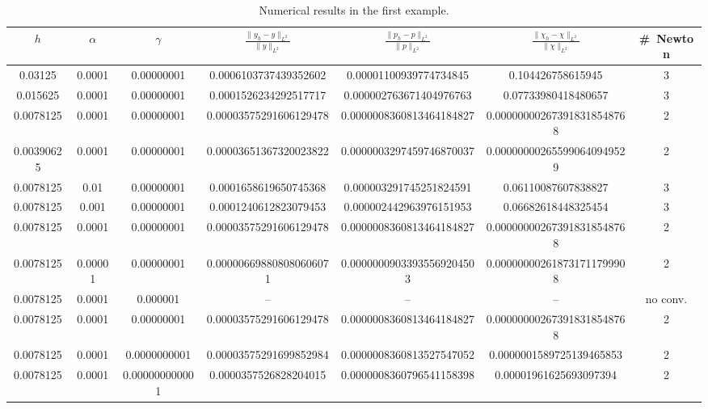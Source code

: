 \documentclass[reqno]{shinyart}
\begin{document}
\begin{table}
    \caption{Numerical results in the first example.}\label{tab:ex1}
    \centering
    \begin{tabular}{ccccccc}
        \toprule
        $h$ & $\alpha$ & $\gamma$ & $\frac{\|y_h - y\|_{L^2}}{\|y\|_{L^2}}$
            & $\frac{\|p_h - p\|_{L^2}}{\|p\|_{L^2}}$
            & $\frac{\|\chi_h - \chi\|_{L^2}}{\|\chi\|_{L^2}}$
            & \#~Newton\\
        \midrule
        \num{0.03125} & \num{0.0001} & \num{0.00000001} & \num{0.0006103737439352602} &
        \num{0.00001100939774734845} & \num{0.104426758615945} & \num{3} \\ 
        \num{0.015625} & \num{0.0001} & \num{0.00000001} & \num{0.0001526234292517717} & 
        \num{0.000002763671404976763} & \num{0.07733980418480657} & \num{3} \\ 
        \num{0.0078125} & \num{0.0001} & \num{0.00000001} & \num{0.00003575291606129478} &
        \num{0.0000008360813464184827} & \num{0.000000002673918318548768} & \num{2} \\ 
        \num{0.00390625} & \num{0.0001} & \num{0.00000001} & \num{0.00003651367320023822} & 
        \num{0.0000003297459746870037} & \num{0.000000002655990640949529} & \num{2} \\ 
        \midrule
        \num{0.0078125} & \num{0.01} & \num{0.00000001} & \num{0.0001658619650745368} &
        \num{0.000003291745251824591} & \num{0.06110087607838827} & \num{3} \\ 
        \num{0.0078125} & \num{0.001} & \num{0.00000001} & \num{0.0001240612823079453} & 
        \num{0.000002442963976151953} & \num{0.06682618448325454} & \num{3}  \\ 
        \num{0.0078125} & \num{0.0001} & \num{0.00000001} & \num{0.00003575291606129478} & 
        \num{0.0000008360813464184827} & \num{0.000000002673918318548768} & \num{2} \\ 
        \num{0.0078125} & \num{0.00001} & \num{0.00000001} & \num{0.000006698808080606071} & 
        \num{0.00000009033935569204503} & \num{0.000000002618731711799908} & \num{2} \\ 
        \midrule
        \num{0.0078125} & \num{0.0001} & \num{0.000001} & -- & -- & -- & no conv. \\ 
        \num{0.0078125} & \num{0.0001} & \num{0.00000001} & \num{0.00003575291606129478} & 
        \num{0.0000008360813464184827} & \num{0.000000002673918318548768} & \num{2} \\ 
        \num{0.0078125} & \num{0.0001} & \num{0.0000000001} & \num{0.00003575291699852984} & 
        \num{0.0000008360813527547052} & \num{0.0000001589725139465853} & \num{2} \\ 
        \num{0.0078125} & \num{0.0001} & \num{0.000000000001} & \num{0.0000357526828204015} & 
        \num{0.0000008360796541158398} & \num{0.00001961625693097394} & \num{2} \\
        \bottomrule
    \end{tabular}
\end{table}
\end{document}
